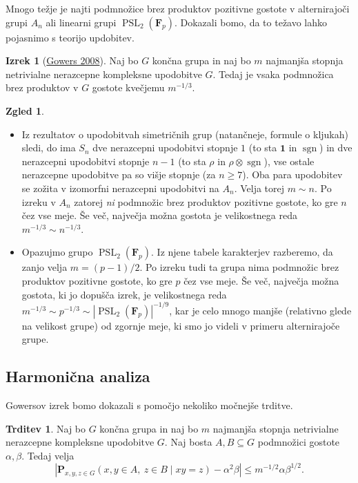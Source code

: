 \documentclass[11pt]{book}
\def\11{\mathbf{1}}
\def\FF{\mathbf{F}}
\def\PP{\mathbf{P}}
\DeclareMathOperator\sgn{sgn}
\DeclareMathOperator\PSL{PSL}
\theoremstyle{definition}
\theoremstyle{zgled}
\newtheorem*{zgled}{Zgled}
\theoremstyle{odprtproblem}
\theoremstyle{domacanaloga}
\theoremstyle{izrek}
\newtheorem*{izrek}{Izrek}
\newtheorem*{trditev}{Trditev}
\begin{document}
Mnogo težje je najti podmnožice brez produktov pozitivne gostote v alternirajoči grupi $A_n$ ali linearni grupi $\PSL_2(\FF_p)$. Dokazali bomo, da to težavo lahko pojasnimo s teorijo updobitev.

\begin{izrek}[\href{https://www.cambridge.org/core/journals/combinatorics-probability-and-computing/article/abs/quasirandom-groups/A885920D04E04BC63766C052C666931A}{Gowers 2008}]
Naj bo $G$ končna grupa in naj bo $m$ najmanjša stopnja netrivialne nerazcepne kompleksne upodobitve $G$. Tedaj je vsaka podmnožica brez produktov v $G$ gostote kvečjemu $m^{-1/3}$.
\end{izrek}

\begin{zgled} \leavevmode
\begin{itemize}
    \item Iz rezultatov o upodobitvah simetričnih grup (natančneje, formule o kljukah) sledi, do ima $S_n$ dve nerazcepni upodobitvi stopnje $1$ (to sta $\11$ in $\sgn$) in dve nerazcepni upodobitvi stopnje $n-1$ (to sta $\rho$ in $\rho \otimes \sgn$), vse ostale nerazcepne upodobitve pa so višje stopnje (za $n \geq 7$). Oba para upodobitev se zožita v izomorfni nerazcepni upodobitvi na $A_n$. Velja torej $m \sim n$. Po izreku v $A_n$ zatorej \emph{ni} podmnožic brez produktov pozitivne gostote, ko gre $n$ čez vse meje. Še več, največja možna gostota je velikostnega reda $m^{-1/3} \sim n^{-1/3}$.

    \item Opazujmo grupo $\PSL_2(\FF_p)$. Iz njene tabele karakterjev razberemo, da zanjo velja $m = (p-1)/2$. Po izreku tudi ta grupa nima podmnožic brez produktov pozitivne gostote, ko gre $p$ čez vse meje. Še več, največja možna gostota, ki jo dopušča izrek, je velikostnega reda $m^{-1/3} \sim p^{-1/3} \sim |\PSL_2(\FF_p)|^{-1/9}$, kar je celo mnogo manjše (relativno glede na velikost grupe) od zgornje meje, ki smo jo videli v primeru alternirajoče grupe.
\end{itemize}
\end{zgled}

\subsection{Harmonična analiza}

Gowersov izrek bomo dokazali s pomočjo nekoliko močnejše trditve.

\begin{trditev}
Naj bo $G$ končna grupa in naj bo $m$ najmanjša stopnja netrivialne nerazcepne kompleksne upodobitve $G$. Naj bosta $A,B \subseteq G$ podmnožici gostote $\alpha, \beta$. Tedaj velja
\[
    \left| 
        \PP_{x,y,z \in G}(x,y \in A, \ z \in B \mid xy = z) - \alpha^2 \beta
    \right| 
    \leq
    m^{-1/2} \alpha \beta^{1/2}.
\]
\end{trditev}
\end{document}
